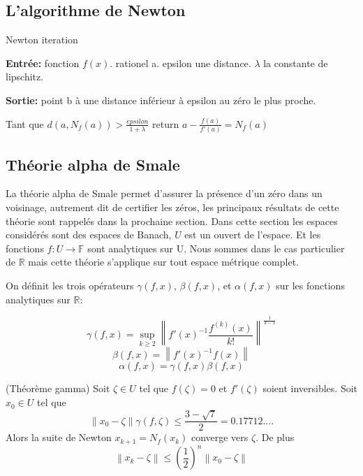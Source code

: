 \documentclass[a4paper,10.5pt]{article}
\begin{document}
	\subsection{L'algorithme de Newton}
	
	
	
	\begin{algorithm}
		\caption{Newton iteration}
		
		\vspace{2mm}
		
		\textbf{Entrée:} fonction $f(x)$. rationel a. epsilon une distance. $\lambda$ la constante de lipschitz.
		
		\textbf{Sortie:} point b à une distance inférieur à epsilon au zéro le plus proche. 
		
		\begin{algorithmic}[1]
			\STATE Tant que $d(a,N_{f}(a))>\frac{epsilon}{1+\lambda}$
			 return $a-\frac{f(a)}{f'(a)}=N_{f}(a)$
		\end{algorithmic}
	\end{algorithm}

	\subsection{Théorie alpha de Smale}
	La théorie alpha de Smale permet d'assurer la présence d'un zéro dans un voisinage, autrement dit de certifier les zéros, les principaux résultats de cette théorie sont rappelés dans la prochaine section.
	Dans cette section les espaces considérés sont des espaces de Banach, $U$ est un ouvert de l'espace. Et les fonctions $f:U\rightarrow \mathbb{F}$ sont analytiques sur U. Nous sommes dans le cas particulier de $\mathbb{R}$ mais cette théorie s'applique sur tout espace métrique complet. 
	
	\begin{definition}
		
		On définit les trois opérateurs $\gamma(f,x)$, $\beta(f,x)$, et $\alpha(f,x)$ sur les fonctions analytiques sur $\mathbb{R}$:
		
		\[\gamma(f,x)=\sup_{k \geq 2}\left\|f'(x)^{-1}\frac{f^{(k)}(x)}{k!}\right\|^{\frac{1}{k-1}}\]
		\[\beta(f,x)=\left\|f'(x)^{-1}f(x)\right\|\]
		\[\alpha(f,x)=\gamma(f,x)\beta(f,x)\]
	\end{definition}
	
	\begin{theorem}(Théorème gamma) Soit $\zeta \in U$ tel que $f(\zeta)=0$ et $f'(\zeta)$ soient inversibles. Soit $x_{0} \in U$ tel que \\
		\[\left\|x_{0}-\zeta\right\|\gamma(f,\zeta) \leq \frac{3-\sqrt{7}}{2}=0.17712.... \]
		Alors la suite de Newton $x_{k+1}=N_{f}(x_{k})$ converge vers $\zeta$. De plus\\
		\[\left\|x_{k}-\zeta\right\| \leq \left(\frac{1}{2}\right)^{n}\left\|x_{0}-\zeta\right\|\]
	\end{theorem}
	
\end{document}
